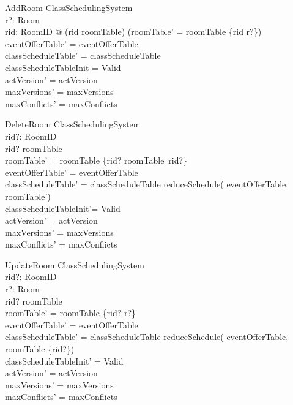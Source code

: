 \documentclass[a4paper]{article}
\begin{document}
\begin{schema}{AddRoom}
  \Delta ClassSchedulingSystem \\
  r?: Room \\
  \where 
  \exists rid: RoomID @ (rid \notin \dom roomTable) \land (roomTable' =
  roomTable \cup \{rid \mapsto r?\}) \\ 
  eventOfferTable' = eventOfferTable \\
  classScheduleTable' = classScheduleTable \\
  classScheduleTableInit = Valid \\
  actVersion' =  actVersion \\
  maxVersions' = maxVersions \\
  maxConflicts' = maxConflicts
\end{schema}
\begin{schema}{DeleteRoom}
  \Delta ClassSchedulingSystem \\
  rid?: RoomID \\
  \where
  rid? \in \dom roomTable \\
  roomTable' = roomTable \setminus \{rid? \mapsto roomTable~rid?\} \\
  eventOfferTable' = eventOfferTable \\
  classScheduleTable' = classScheduleTable \comp reduceSchedule(\dom
  eventOfferTable, \dom roomTable') \\ 
  classScheduleTableInit'= Valid \\
  actVersion' =  actVersion \\
  maxVersions' = maxVersions \\
  maxConflicts' = maxConflicts
\end{schema}
\begin{schema}{UpdateRoom}
  \Delta ClassSchedulingSystem \\
  rid?: RoomID \\
  r?: Room \\
  \where
  rid? \in \dom roomTable \\
  roomTable' = roomTable \oplus \{rid?  \mapsto r?\} \\
  eventOfferTable' = eventOfferTable \\
  classScheduleTable' = classScheduleTable \comp reduceSchedule(\dom
  eventOfferTable, \dom roomTable \setminus \{rid?\}) \\
  classScheduleTableInit' = Valid \\
  actVersion' =  actVersion \\
  maxVersions' = maxVersions \\
  maxConflicts' = maxConflicts \\
\end{schema}
\end{document}
